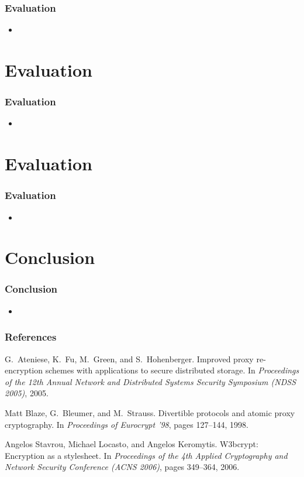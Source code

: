 \documentclass{beamer}
\begin{document}
\begin{frame}
\frametitle{Evaluation}
\begin{itemize}
\item
\end{itemize}
\end{frame}

\section{Evaluation}
\begin{frame}
\frametitle{Evaluation}
\begin{itemize}
\item
\end{itemize}
\end{frame}

\section{Evaluation}
\begin{frame}
\frametitle{Evaluation}
\begin{itemize}
\item
\end{itemize}
\end{frame}

\section{Conclusion}
\begin{frame}
\frametitle{Conclusion}
\begin{itemize}
\item
\end{itemize}
\end{frame}

\begin{thebibliography}{10}
\frametitle{References}
G.~Ateniese, K.~Fu, M.~Green, and S.~Hohenberger.
\newblock Improved proxy re-encryption schemes with applications to secure
  distributed storage.
\newblock In {\em Proceedings of the 12th Annual Network and Distributed
  Systems Security Symposium (NDSS 2005)}, 2005.

Matt Blaze, G.~Bleumer, and M.~Strauss.
\newblock Divertible protocols and atomic proxy cryptography.
\newblock In {\em Proceedings of Eurocrypt '98}, pages 127--144, 1998.

Angelos Stavrou, Michael Locasto, and Angelos Keromytis.
\newblock W3bcrypt: Encryption as a stylesheet.
\newblock In {\em Proceedings of the 4th Applied Cryptography and Network
  Security Conference (ACNS 2006)}, pages 349--364, 2006.

\end{thebibliography}
\end{document}
